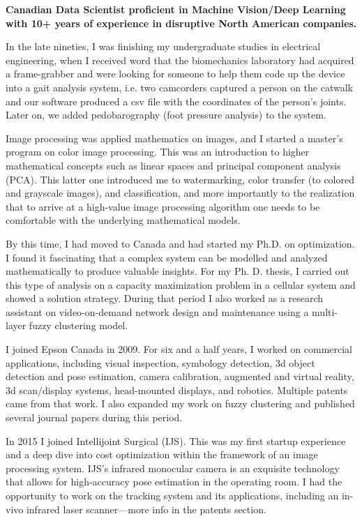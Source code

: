 \onehalfspace
\textbf{\large Canadian Data Scientist proficient in Machine Vision/Deep Learning with 10+ years of experience in 
disruptive North American companies.}
\singlespace

\vspace{1cm}

In the late nineties, I was finishing my undergraduate studies in electrical engineering, when I received word that
the biomechanics laboratory had acquired a frame-grabber and were looking for someone to help them code up the device
into a gait analysis system, i.e. two camcorders captured a person on the catwalk and our software produced 
a csv file with the coordinates of the person's joints. Later on, we added pedobarography (foot pressure analysis) to the 
system. 

\vspace{0.5cm}
Image processing was applied mathematics on images, and I started a master's program on color image processing. 
This was an introduction to higher mathematical concepts such as linear spaces and principal component analysis (PCA). This
latter one introduced me to watermarking, color transfer (to colored and grayscale images), and classification, and more 
importantly to the realization that to arrive at a high-value image processing algorithm one needs to be comfortable with
the underlying mathematical models. 

\vspace{0.5cm}
By this time, I had moved to Canada and had started my Ph.D. on optimization. I found it fascinating that a complex system can be modelled and analyzed mathematically to produce valuable insights. For my Ph. D. thesis, I carried out this type of analysis on a capacity maximization problem in a cellular system and showed a solution strategy. 
During that period I also worked as a research assistant on video-on-demand network design and maintenance using a multi-layer 
fuzzy clustering model.

\vspace{0.5cm}
I joined Epson Canada in 2009. For six and a half years, I worked on commercial applications, including visual inspection, 
symbology detection, 3d object detection and pose estimation, camera calibration, augmented and virtual reality, 3d scan/display systems, head-mounted displays, and robotics. Multiple patents came from that work. I also expanded my work on fuzzy clustering and published several journal papers during this period.

\vspace{0.5cm}
In 2015 I joined Intellijoint Surgical (IJS). This was my first startup experience and a deep dive into cost optimization within the framework of an image processing system. IJS's infrared monocular camera is an exquisite technology that allows for high-accuracy pose estimation in the operating room. I had the opportunity to work on the tracking system and its applications, including an in-vivo infrared laser scanner—more info in the patents section.

